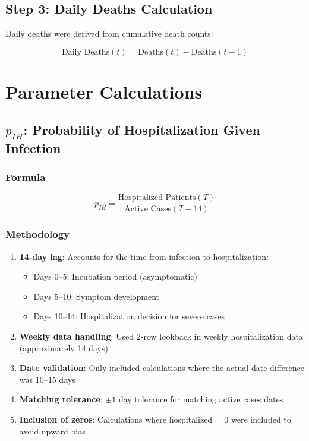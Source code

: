 \documentclass[11pt]{article}
\begin{document}
\subsection{Step 3: Daily Deaths Calculation}

Daily deaths were derived from cumulative death counts:

\begin{equation}
    \text{Daily Deaths}(t) = \text{Deaths}(t) - \text{Deaths}(t-1)
\end{equation}

\section{Parameter Calculations}

\subsection{$p_{IH}$: Probability of Hospitalization Given Infection}

\subsubsection{Formula}
\begin{equation}
    p_{IH} = \frac{\text{Hospitalized Patients}(T)}{\text{Active Cases}(T-14)}
\end{equation}

\subsubsection{Methodology}
\begin{enumerate}
    \item \textbf{14-day lag}: Accounts for the time from infection to hospitalization:
    \begin{itemize}
        \item Days 0--5: Incubation period (asymptomatic)
        \item Days 5--10: Symptom development
        \item Days 10--14: Hospitalization decision for severe cases
    \end{itemize}
    \item \textbf{Weekly data handling}: Used 2-row lookback in weekly hospitalization data (approximately 14 days)
    \item \textbf{Date validation}: Only included calculations where the actual date difference was 10--15 days
    \item \textbf{Matching tolerance}: $\pm 1$ day tolerance for matching active cases dates
    \item \textbf{Inclusion of zeros}: Calculations where hospitalized = 0 were included to avoid upward bias
\end{enumerate}
\end{document}
